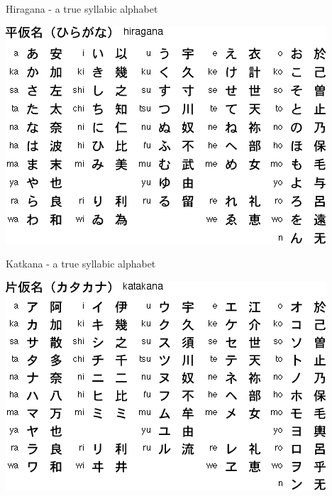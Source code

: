 \documentclass[xetex]{beamer}
\begin{document}
\begin{frame}{Hiragana - a true syllabic alphabet} 

\begin{center}
   \includegraphics[height=0.8\textheight]{pics/hiragana.png}
\end{center}

\end{frame}
\begin{frame}{Katkana - a true syllabic alphabet} 

\begin{center}
   \includegraphics[height=0.8\textheight]{pics/katakana.png}
\end{center}

\end{frame}
\end{document}

